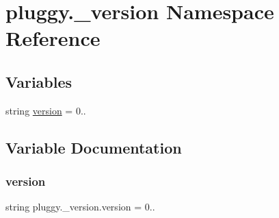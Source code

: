 \hypertarget{namespacepluggy_1_1__version}{}\section{pluggy.\+\_\+version Namespace Reference}
\label{namespacepluggy_1_1__version}
\subsection*{Variables}
\begin{DoxyCompactItemize}
\item 
string \hyperlink{namespacepluggy_1_1__version_a6402284cfdbee32e7a1c4984e376fd01}{version} = \textquotesingle{}0..\textquotesingle{}
\end{DoxyCompactItemize}


\subsection{Variable Documentation}
\mbox{\label{namespacepluggy_1_1__version_a6402284cfdbee32e7a1c4984e376fd01}} 
\subsubsection{\texorpdfstring{version}{version}}
{\footnotesize\ttfamily string pluggy.\+\_\+version.\+version = \textquotesingle{}0..\textquotesingle{}}

